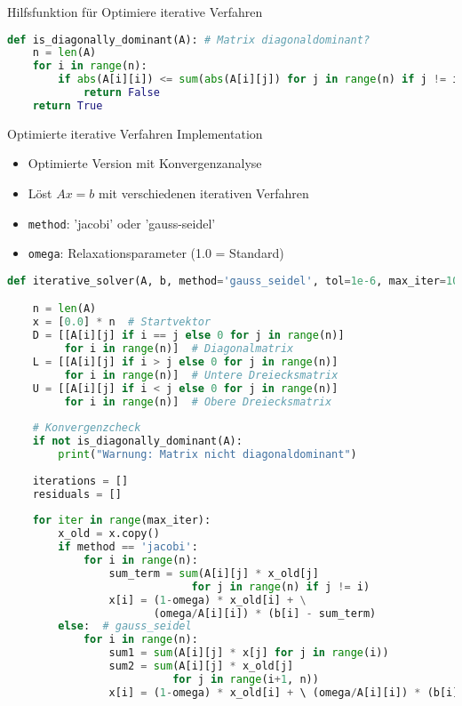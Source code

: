 \begin{examplecode}{Hilfsfunktion für Optimiere iterative Verfahren}
\begin{lstlisting}[language=Python, style=basesmol]
def is_diagonally_dominant(A): # Matrix diagonaldominant?
    n = len(A)
    for i in range(n):
        if abs(A[i][i]) <= sum(abs(A[i][j]) for j in range(n) if j != i):
            return False
    return True
\end{lstlisting}
\end{examplecode}

\begin{examplecode}{Optimierte iterative Verfahren Implementation}
    \begin{itemize}
        \item Optimierte Version mit Konvergenzanalyse
        \item Löst $Ax = b$ mit verschiedenen iterativen Verfahren
        \item \texttt{method}: 'jacobi' oder 'gauss-seidel'
        \item \texttt{omega}: Relaxationsparameter (1.0 = Standard)
    \end{itemize}
\begin{lstlisting}[language=Python, style=basesmol]
def iterative_solver(A, b, method='gauss_seidel', tol=1e-6, max_iter=100, omega=1.0):

    n = len(A)
    x = [0.0] * n  # Startvektor
    D = [[A[i][j] if i == j else 0 for j in range(n)] 
         for i in range(n)]  # Diagonalmatrix
    L = [[A[i][j] if i > j else 0 for j in range(n)] 
         for i in range(n)]  # Untere Dreiecksmatrix
    U = [[A[i][j] if i < j else 0 for j in range(n)] 
         for i in range(n)]  # Obere Dreiecksmatrix
    
    # Konvergenzcheck
    if not is_diagonally_dominant(A):
        print("Warnung: Matrix nicht diagonaldominant")
    
    iterations = []
    residuals = []
    
    for iter in range(max_iter):
        x_old = x.copy()
        if method == 'jacobi':
            for i in range(n):
                sum_term = sum(A[i][j] * x_old[j] 
                             for j in range(n) if j != i)
                x[i] = (1-omega) * x_old[i] + \
                       (omega/A[i][i]) * (b[i] - sum_term)
        else:  # gauss_seidel
            for i in range(n):
                sum1 = sum(A[i][j] * x[j] for j in range(i))
                sum2 = sum(A[i][j] * x_old[j] 
                          for j in range(i+1, n))
                x[i] = (1-omega) * x_old[i] + \ (omega/A[i][i]) * (b[i] - sum1 - sum2)


\end{lstlisting}
\end{examplecode}
